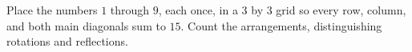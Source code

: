 Place the numbers $1$ through $9$, each once, in a $3$ by $3$ grid so every row, column, and both main diagonals sum to $15$. Count the arrangements, distinguishing rotations and reflections.
